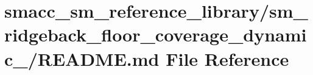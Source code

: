 \hypertarget{smacc__sm__reference__library_2sm__ridgeback__floor__coverage__dynamic__1_2README_8md}{}\section{smacc\+\_\+sm\+\_\+reference\+\_\+library/sm\+\_\+ridgeback\+\_\+floor\+\_\+coverage\+\_\+dynamic\+\_/\+R\+E\+A\+D\+ME.md File Reference}
\label{smacc__sm__reference__library_2sm__ridgeback__floor__coverage__dynamic__1_2README_8md}
